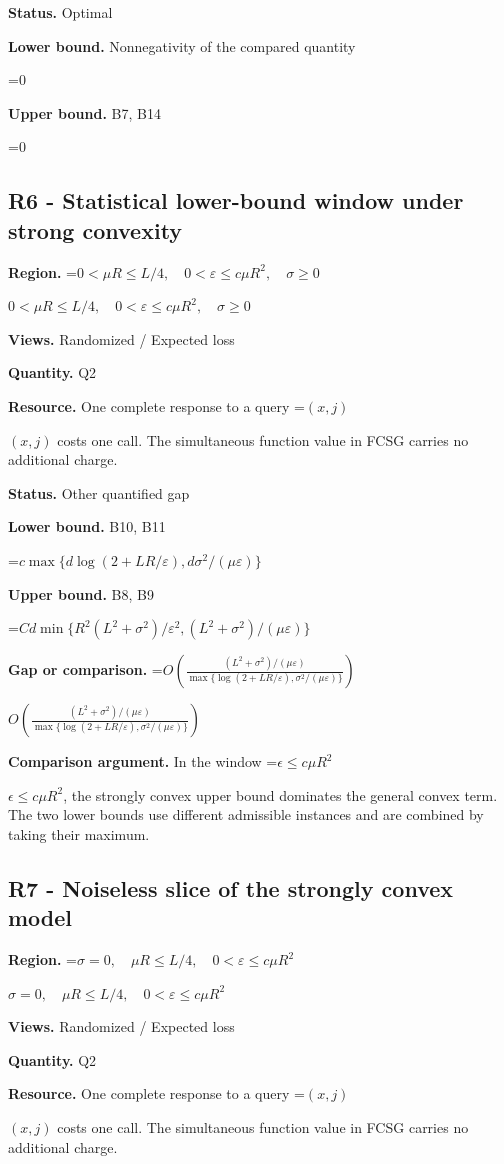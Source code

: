 \documentclass[10pt,a4paper]{article}
\newcommand{\AtlasMath}[1]{\par\begingroup\centering\setbox0=\hbox{$\displaystyle #1$}\ifdim\wd0>1.4\linewidth\typeout{ATLAS WIDE FORMULA: \the\wd0}\fi\ifdim\wd0>\linewidth\resizebox{\linewidth}{!}{\box0}\else\box0\fi\par\endgroup}
\newcommand{\AtlasInlineMath}[1]{\begingroup\setbox0=\hbox{$#1$}\ifdim\wd0>.4\linewidth\endgroup\AtlasMath{#1}\else\endgroup$#1$\fi}
\begin{document}
\textbf{Status.} Optimal

\textbf{Lower bound.} Nonnegativity of the compared quantity

\AtlasMath{0}
\textbf{Upper bound.} B7, B14

\AtlasMath{0}
\subsection{R6 - Statistical lower-bound window under strong convexity}
\textbf{Region.} \AtlasInlineMath{0<\mu R\le L/4,\quad0<\varepsilon\le c\mu R^2,\quad\sigma\ge0}

\textbf{Views.} Randomized / Expected loss

\textbf{Quantity.} Q2

\textbf{Resource.} One complete response to a query \AtlasInlineMath{(x,j)} costs one call. The simultaneous function value in FCSG carries no additional charge.

\textbf{Status.} Other quantified gap

\textbf{Lower bound.} B10, B11

\AtlasMath{c\max\{d\log(2+LR/\varepsilon),d\sigma^2/(\mu\varepsilon)\}}
\textbf{Upper bound.} B8, B9

\AtlasMath{Cd\min\{R^2(L^2+\sigma^2)/\varepsilon^2,(L^2+\sigma^2)/(\mu\varepsilon)\}}
\textbf{Gap or comparison.} \AtlasInlineMath{O\!\left(\frac{(L^2+\sigma^2)/(\mu\varepsilon)}{\max\{\log(2+LR/\varepsilon),\sigma^2/(\mu\varepsilon)\}}\right)}

\textbf{Comparison argument.} In the window \AtlasInlineMath{\epsilon\le c\mu R^2}, the strongly convex upper bound dominates the general convex term. The two lower bounds use different admissible instances and are combined by taking their maximum.

\subsection{R7 - Noiseless slice of the strongly convex model}
\textbf{Region.} \AtlasInlineMath{\sigma=0,\quad\mu R\le L/4,\quad0<\varepsilon\le c\mu R^2}

\textbf{Views.} Randomized / Expected loss

\textbf{Quantity.} Q2

\textbf{Resource.} One complete response to a query \AtlasInlineMath{(x,j)} costs one call. The simultaneous function value in FCSG carries no additional charge.
\end{document}
